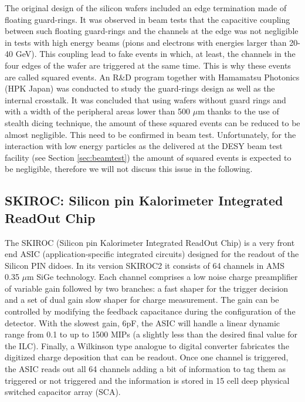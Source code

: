 \documentclass[a4paper,11pt]{article}
\begin{document}
The original design of the silicon wafers included an edge termination made of floating guard-rings.
It was observed in beam tests \cite{Cornat:2015eoa,Cornat:2009zz} that the capacitive coupling between such floating guard-rings 
and the channels at the edge was not negligible in tests with high energy beams (pions and electrons with energies larger than 20-40 GeV).
This coupling lead to fake events in which, at least,
the channels in the four edges of the wafer are triggered at the same time. 
This is why these events are called squared events. 
An R\&D program together with Hamamatsu Photonics (HPK Japan) was conducted to study the guard-rings design 
as well as the internal crosstalk.
It was concluded that using wafers without guard rings and with a width of the peripheral areas lower than 
500 $\mu$m thanks to the use of stealth dicing technique, the amount of these squared events 
can be reduced to be almost negligible. This need to be confirmed in beam test.
Unfortunately, for the interaction with low energy particles as the delivered at the
DESY beam test facility (see Section \ref{sec:beamtest}) the
amount of squared events is expected to be negligible, therefore we will not discuss this issue in the following.

\subsection{SKIROC: Silicon pin Kalorimeter Integrated ReadOut Chip}
\label{sec:skiroc}

The SKIROC\cite{Callier:2011zz} (Silicon pin Kalorimeter Integrated ReadOut Chip) is a
very front end ASIC (application-specific integrated circuits)
designed for the readout of the Silicon PIN didoes.
In its version SKIROC2 it consists of 64 channels in AMS 0.35 $\mu$m SiGe technology.
Each channel comprises a low noise charge preamplifier of variable gain followed by two branches:
a fast shaper for the trigger decision and a set of dual gain slow shaper for charge measurement. 
The gain can be controlled by modifying the feedback capacitance during the configuration of the detector.
With the slowest gain, 6pF, the ASIC will handle a linear dynamic range from 0.1 to up to 1500 MIPs 
(a slightly less than the desired final value for the ILC). 
Finally, a Wilkinson type analogue to digital converter fabricates the digitized charge deposition that can be readout. 
Once one channel is triggered, the ASIC reads out all 64 channels adding a bit of information to tag them as
triggered or not triggered and the information is stored in 15 cell deep physical switched capacitor array (SCA).
\end{document}
